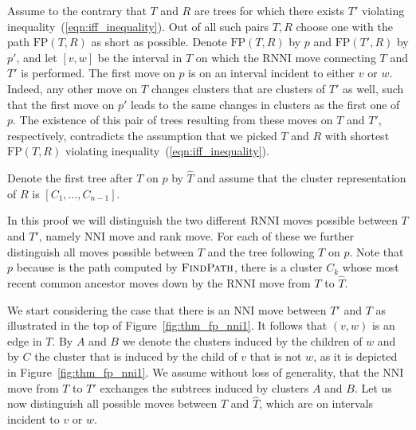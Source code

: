 \documentclass{amsart}
\newcommand{\rnni}{\mathrm{RNNI}}
\newcommand{\findpath}{\textsc{FindPath}}
\newcommand{\nni}{\mathrm{NNI}}
\newcommand{\fp}{\mathrm{FP}}
\begin{document}
Assume to the contrary that $T$ and $R$ are trees for which there exists $T'$ violating inequality~(\ref{eqn:iff_inequality}).
Out of all such pairs $T, R$ choose one with the path $\fp(T, R)$ as short as possible.
Denote $\fp(T,R)$ by $p$ and $\fp(T', R)$ by $p'$, and let $[v, w]$ be the interval in $T$ on which the $\rnni$ move connecting $T$ and $T'$ is performed.
The first move on $p$ is on an interval incident to either $v$ or $w$.
Indeed, any other move on $T$ changes clusters that are clusters of $T'$ as well, such that the first move on $p'$ leads to the same changes in clusters as the first one of $p$.
The existence of this pair of trees resulting from these moves on $T$ and $T'$, respectively, contradicts the assumption that we picked $T$ and $R$ with shortest $\fp(T,R)$ violating inequality~(\ref{eqn:iff_inequality}).

Denote the first tree after $T$ on $p$ by $\hat T$
and assume that the cluster representation of $R$ is $[C_1, \ldots, C_{n-1}]$.

In this proof we will distinguish the two different $\rnni$ moves possible between $T$ and $T'$, namely $\nni$ move and rank move.
For each of these we further distinguish all moves possible between $T$ and the tree following $T$ on $p$.
Note that $p$ because is the path computed by $\findpath$, there is a cluster $C_k$ whose most recent common ancestor moves down by the $\rnni$ move from $T$ to $\hat T$.

We start considering the case that there is an $\nni$ move between $T'$ and $T$ as illustrated in the top of Figure~\ref{fig:thm_fp_nni1}.
It follows that $(v,w)$ is an edge in $T$.
By $A$ and $B$ we denote the clusters induced by the children of $w$ and by $C$ the cluster that is induced by the child of $v$ that is not $w$, as it is depicted in Figure~\ref{fig:thm_fp_nni1}.
We assume without loss of generality, that the $\nni$ move from $T$ to $T'$ exchanges the subtrees induced by clusters $A$ and $B$.
Let us now distinguish all possible moves between $T$ and $\hat T$, which are on intervals incident to $v$ or $w$.
\end{document}
